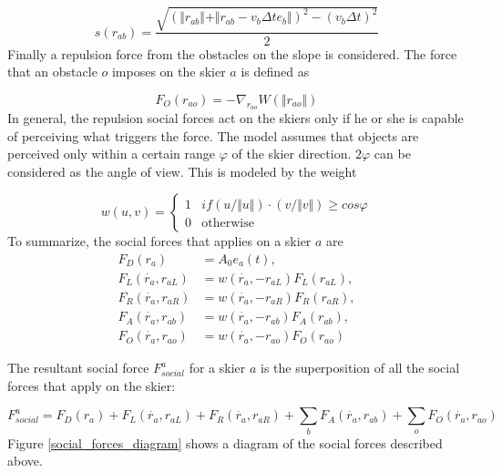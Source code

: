 \documentclass[12pt,a4paper,twoside]{book}
\begin{document}
\begin{equation}\label{skier_s}
s(r_{ab})=\frac{\sqrt{(\Vert r_{ab} \Vert + \Vert r_{ab}-v_b \Delta t e_b \Vert )^2-(v_b \Delta t)^2}}{2}
\end{equation}
Finally a repulsion force from the obstacles on the slope is considered. The force that an obstacle $o$ imposes on the skier $a$ is defined as

\begin{equation}\label{obstacle_force}
F_O(r_{ao})=-\nabla_{r_{ao}}W(\Vert r_{ao} \Vert )
\end{equation}
In general, the repulsion social forces act on the skiers only if he or she is capable of perceiving what triggers the force. The model assumes that objects are perceived only within a certain range $\varphi$ of the skier direction. $2\varphi$ can be considered as the angle of view. This is modeled by the weight

\begin{equation}\label{visibility}
w(u,v)=\begin{cases}
  1 & \text{$if(u/\Vert u \Vert)\cdot (v/\Vert v \Vert) \geq cos \varphi$} \\
  0 & \text{otherwise }
  \end{cases}
\end{equation}
To summarize, the social forces that applies on a skier $a$ are
\begin{align}\label{social_forces_tb}
F_D(r_a)&=A_0 e_a(t),\\
F_L(\dot{r_a},r_{aL})&=w(\dot{r_a},-r_{aL})F_L(r_{aL}),\\
F_R(\dot{r_a},r_{aR})&=w(\dot{r_a},-r_{aR})F_R(r_{aR}),\\
F_A(\dot{r_a},r_{ab})&=w(\dot{r_a},-r_{ab})F_A(r_{ab}),\\
F_O(\dot{r_a},r_{ao})&=w(\dot{r_a},-r_{ao})F_O(r_{ao})
\end{align}

The resultant social force $F^a_{social}$ for a skier $a$ is the superposition of all the social forces that apply on the skier:

\begin{equation}
F^a_{social}=F_D(r_a)+F_L(\dot{r_a},r_{aL})+F_R(\dot{r_a},r_{aR})+\sum_b F_A(\dot{r_a},r_{ab})+\sum_o F_O(\dot{r_a},r_{ao})\nonumber
\end{equation}
Figure \ref{social_forces_diagram} shows a diagram of the social forces described above.
\end{document}
